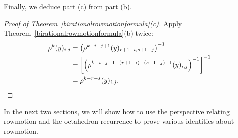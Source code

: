 \documentclass[ALCO,Unicode,published]{cedram}
\numberwithin{equation}{section}
\begin{document}









%
%

Finally, we deduce part (c) from part (b).
%

\begin{proof} [Proof of Theorem~\ref{birationalrowmotionformula}(c)]
Apply Theorem~\ref{birationalrowmotionformula}(b) twice:
\begin{align*}
    \rho^{k}(y)_{i,j} &= \left(\rho^{k-i-j+1}(y)_{r+1-i,s+1-j}\right)^{-1}\\ 
    &= \left[\left(\rho^{k-i-j+1-(r+1-i)-(s+1-j)+1}(y)_{i,j}\right)^{-1}\right]^{-1}\\
    & = \rho^{k-r-s}(y)_{i,j}.\qedhere
\end{align*}
\end{proof}

In the next two sections, we will show how to use the perspective relating rowmotion and the octahedron recurrence to prove various identities about rowmotion.
\end{document}
